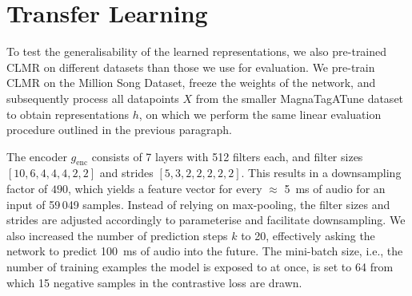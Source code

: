 \section{Transfer Learning}
To test the generalisability of the learned representations, we also pre-trained CLMR on different datasets than those we use for evaluation.
We pre-train CLMR on the Million Song Dataset, freeze the weights of the network, and subsequently process all datapoints $X$ from the smaller MagnaTagATune dataset to obtain representations $h$, on which we perform the same linear evaluation procedure outlined in the previous paragraph.



The encoder $g_{\mathrm{enc}}$ consists of 7 layers with 512 filters each, and filter sizes $[10, 6, 4, 4, 4, 2, 2]$ and strides $[5, 3, 2, 2, 2, 2, 2]$.
This results in a downsampling factor of $490$, which yields a feature vector for every $\approx$ 5~ms of audio for an input of 59\,049 samples.
Instead of relying on max-pooling, the filter sizes and strides are adjusted accordingly to parameterise and facilitate downsampling.
We also increased the number of prediction steps $k$ to 20, effectively asking the network to predict 100~ms of audio into the future.
The mini-batch size, i.e., the number of training examples the model is exposed to at once, is set to 64 from which 15 negative samples in the contrastive loss are drawn.

